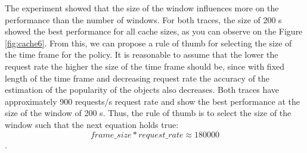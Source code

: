 The experiment showed that the size of the window influences more on the performance than the number of windows. For both traces, the size of 200 s showed the best performance for all cache sizes, as you can observe on the Figure \ref{fig:cache6}. From this, we can propose a rule of thumb for selecting the size of the time frame for the policy. It is reasonable to assume that the lower the request rate the higher the size of the time frame should be, since with fixed length of the time frame and decreasing request rate the accuracy of the estimation of the popularity of the objects also decreases. Both traces have approximately 900 requests/s request rate and show the best performance at the size of the window of 200 s. Thus, the rule of thumb is to select the size of the window such that the next equation holds true: $$ frame\_size * request\_rate \approx  180000 $$.